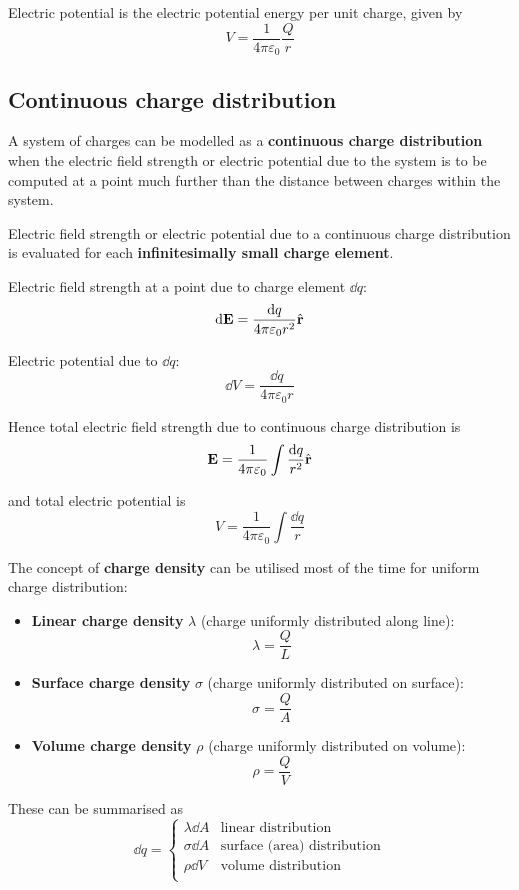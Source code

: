 Electric potential is the electric potential energy per unit charge, given by
\begin{equation}
V=\frac{1}{4\pi\varepsilon_0}\frac{Q}{r}
\end{equation}

\subsection{Continuous charge distribution}
A system of charges can be modelled as a \textbf{continuous charge distribution} when the electric field strength or electric potential due to the system is to be computed at a point much further than the distance between charges within the system.

Electric field strength or electric potential due to a continuous charge distribution is evaluated for each \textbf{infinitesimally small charge element}.

Electric field strength at a point due to charge element $\dd{q}$:
\[ \dd{\vb{E}} = \frac{\dd{q}}{4\pi\varepsilon_0r^2}\hat{\vb{r}} \]

Electric potential due to $\dd{q}$:
\[ \dd{V} = \frac{\dd{q}}{4\pi\varepsilon_0r} \]

Hence total electric field strength due to continuous charge distribution is 
\begin{equation}
\vb{E} = \frac{1}{4\pi\varepsilon_0} \int \frac{\dd{q}}{r^2} \hat{\vb{r}}
\end{equation}

and total electric potential is
\begin{equation}
V = \frac{1}{4\pi\varepsilon_0} \int \frac{\dd{q}}{r}
\end{equation}

The concept of \textbf{charge density} can be utilised most of the time for uniform charge distribution:
\begin{itemize}
\item \textbf{Linear charge density} $\lambda$ (charge uniformly distributed along line):
\[ \lambda = \frac{Q}{L} \]
\item \textbf{Surface charge density} $\sigma$ (charge uniformly distributed on surface):
\[ \sigma = \frac{Q}{A} \]
\item \textbf{Volume charge density} $\rho$ (charge uniformly distributed on volume):
\[ \rho = \frac{Q}{V} \]
\end{itemize}

These can be summarised as
\begin{equation*}
\dd{q} = \begin{cases}
    \lambda\dd{A} & \text{linear distribution} \\
    \sigma\dd{A} & \text{surface (area) distribution} \\
    \rho\dd{V} & \text{volume distribution} \\
\end{cases}
\end{equation*}
\pagebreak

